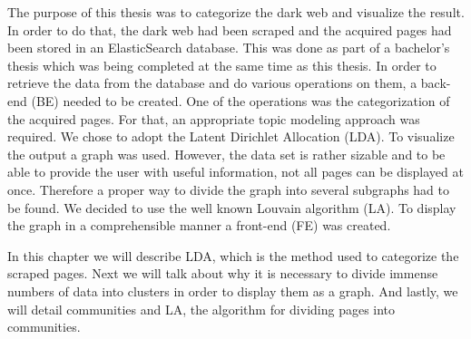 The purpose of this thesis was to categorize the dark web and visualize the result. In order to do that, the dark web had been scraped and the acquired pages had been stored in an ElasticSearch database. This was done as part of a bachelor's thesis which was being completed at the same time as this thesis. In order to retrieve the data from the database and do various operations on them, a back-end (BE) needed to be created. One of the operations was the categorization of the acquired pages. For that, an appropriate topic modeling approach was required. We chose to adopt the Latent Dirichlet Allocation (LDA). To visualize the output a graph was used. However, the data set is rather sizable and to be able to provide the user with useful information, not all pages can be displayed at once. Therefore a proper way to divide the graph into several subgraphs had to be found. We decided to use the well known Louvain algorithm (LA). To display the graph in a comprehensible manner a front-end (FE) was created.

In this chapter we will describe LDA,  which is the method used to categorize the scraped pages. Next we will talk about why it is necessary to divide immense numbers of data into clusters in order to display them as a graph. And lastly, we will detail communities and LA, the algorithm for dividing pages into communities. 

